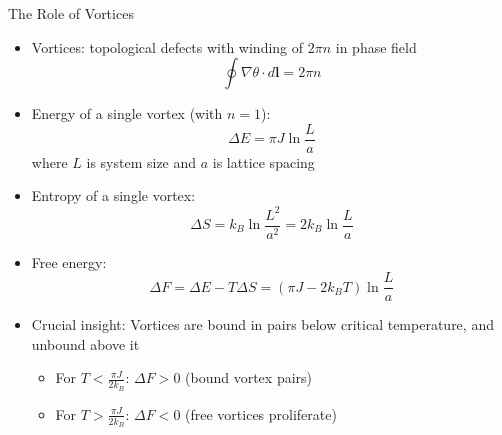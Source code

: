 \documentclass[11pt,aspectratio=169]{beamer}
\newcommand\mathalert[1]{{\color{accentcolor}#1}}
\begin{document}
\begin{frame}{The Role of Vortices}
    \begin{itemize}
        \item Vortices: topological defects with winding of $2\pi n$ in phase field
        \begin{equation*}
            \oint \nabla \theta \cdot d\mathbf{l} = 2\pi n
        \end{equation*}
        \item Energy of a single vortex (with $n=1$):
        \begin{equation*}
            \Delta E = \pi J \ln \frac{L}{a}
        \end{equation*}
        where $L$ is system size and $a$ is lattice spacing
        \pause
        \item Entropy of a single vortex:
        \begin{equation*}
            \Delta S = k_B \ln \frac{L^2}{a^2} = 2k_B \ln \frac{L}{a}
        \end{equation*}
        \pause
        \item Free energy:
        \begin{equation*}
            \Delta F = \Delta E - T\Delta S = (\pi J - 2k_B T)\ln \frac{L}{a}
        \end{equation*}
        \pause
        \item \mathalert{Crucial insight}: Vortices are bound in pairs below critical temperature, and unbound above it
        \begin{itemize}
            \item For $T < \frac{\pi J}{2k_B}$: $\Delta F > 0$ (bound vortex pairs)
            \item For $T > \frac{\pi J}{2k_B}$: $\Delta F < 0$ (free vortices proliferate)
        \end{itemize}
    \end{itemize}
\end{frame}
\end{document}
